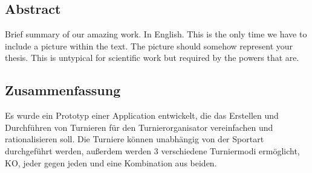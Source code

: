 \begin{spacing}{1}
    \chapter*{Abstract}
\end{spacing}
Brief summary of our amazing work. In English.
This is the only time we have to include a picture within the text.
The picture should somehow represent your thesis.
This is untypical for scientific work but required by the powers that are.
\lipsum[6]
\newpage
\begin{spacing}{1}
    \chapter*{Zusammenfassung}
\end{spacing}
Es wurde ein Prototyp einer Application entwickelt, die das Erstellen und Durchführen 
von Turnieren für den Turnierorganisator vereinfachen und rationalisieren soll.
Die Turniere können unabhängig von der Sportart durchgeführt werden, außerdem 
werden 3 verschiedene Turniermodi ermöglicht, KO, jeder gegen jeden und eine Kombination aus beiden.

\lipsum[6]
